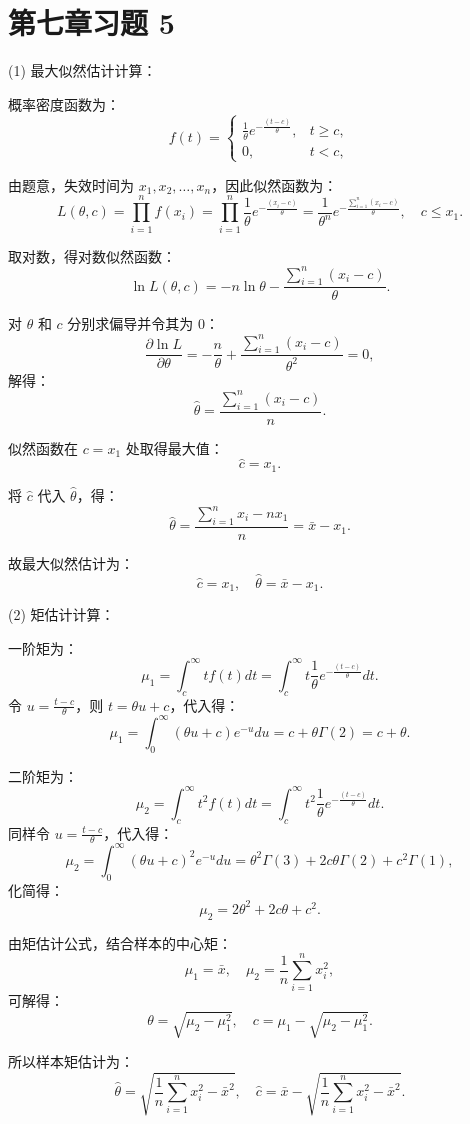 \documentclass[twoside]{article}
\begin{document}
\maketitle
\vspace{-3.5em}

\tableofcontents

\section{第七章习题 5}

\begin{ans}{5}{5}
(1) 最大似然估计计算：

概率密度函数为：
\[
f(t) = 
\begin{cases} 
\frac{1}{\theta} e^{-\frac{(t-c)}{\theta}}, & t \geq c, \\
0, & t < c,
\end{cases}
\]

由题意，失效时间为 \( x_1, x_2, \ldots, x_n \)，因此似然函数为：
\[
L(\theta, c) = \prod_{i=1}^n f(x_i) = \prod_{i=1}^n \frac{1}{\theta} e^{-\frac{(x_i-c)}{\theta}} = \frac{1}{\theta^n} e^{-\frac{\sum_{i=1}^n (x_i-c)}{\theta}}, \quad c \leq x_1.
\]

取对数，得对数似然函数：
\[
\ln L(\theta, c) = -n \ln \theta - \frac{\sum_{i=1}^n (x_i-c)}{\theta}.
\]

对 \(\theta\) 和 \(c\) 分别求偏导并令其为 0：
\[
\frac{\partial \ln L}{\partial \theta} = -\frac{n}{\theta} + \frac{\sum_{i=1}^n (x_i-c)}{\theta^2} = 0,
\]
解得：
\[
\hat{\theta} = \frac{\sum_{i=1}^n (x_i-c)}{n}.
\]

似然函数在 \(c = x_1\) 处取得最大值：
\[
\hat{c} = x_1.
\]

将 \(\hat{c}\) 代入 \(\hat{\theta}\)，得：
\[
\hat{\theta} = \frac{\sum_{i=1}^n x_i - n x_1}{n} = \bar{x} - x_1.
\]

故最大似然估计为：
\[
\hat{c} = x_1, \quad \hat{\theta} = \bar{x} - x_1.
\]

(2) 矩估计计算：

一阶矩为：
\[
\mu_1 = \int_{c}^\infty t f(t) dt = \int_{c}^\infty t \frac{1}{\theta} e^{-\frac{(t-c)}{\theta}} dt.
\]
令 \(u = \frac{t-c}{\theta}\)，则 \(t = \theta u + c\)，代入得：
\[
\mu_1 = \int_{0}^\infty (\theta u + c) e^{-u} du = c + \theta \Gamma(2) = c + \theta.
\]

二阶矩为：
\[
\mu_2 = \int_{c}^\infty t^2 f(t) dt = \int_{c}^\infty t^2 \frac{1}{\theta} e^{-\frac{(t-c)}{\theta}} dt.
\]
同样令 \(u = \frac{t-c}{\theta}\)，代入得：
\[
\mu_2 = \int_{0}^\infty (\theta u + c)^2 e^{-u} du = \theta^2 \Gamma(3) + 2c\theta \Gamma(2) + c^2 \Gamma(1),
\]
化简得：
\[
\mu_2 = 2\theta^2 + 2c\theta + c^2.
\]

由矩估计公式，结合样本的中心矩：
\[
\mu_1 = \bar{x}, \quad \mu_2 = \frac{1}{n} \sum_{i=1}^n x_i^2,
\]
可解得：
\[
\theta = \sqrt{\mu_2 - \mu_1^2}, \quad c = \mu_1 - \sqrt{\mu_2 - \mu_1^2}.
\]

所以样本矩估计为：
\[
\hat{\theta} = \sqrt{\frac{1}{n} \sum_{i=1}^n x_i^2 - \bar{x}^2}, \quad \hat{c} = \bar{x} - \sqrt{\frac{1}{n} \sum_{i=1}^n x_i^2 - \bar{x}^2}.
\]

\end{ans}
\end{document}

